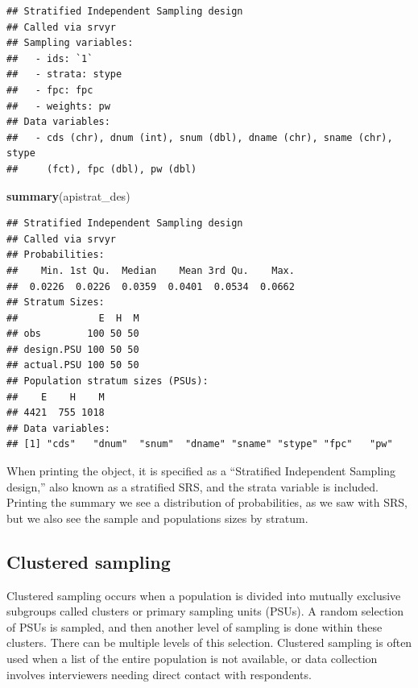 \documentclass[
]{krantz}
\makeatletter
\newenvironment{Shaded}{\begin{snugshade}}{\end{snugshade}}
\newcommand{\FunctionTok}[1]{\textcolor[rgb]{0.27,0.27,0.27}{\textbf{#1}}}
\newcommand{\NormalTok}[1]{#1}
\newenvironment{kframe}{%
\medskip{}
\setlength{\fboxsep}{.8em}
 \def\at@end@of@kframe{}%
 \ifinner\ifhmode%
  \def\at@end@of@kframe{\end{minipage}}%
  \begin{minipage}{\columnwidth}%
 \fi\fi%
 \def\FrameCommand##1{\hskip\@totalleftmargin \hskip-\fboxsep
 \colorbox{shadecolor}{##1}\hskip-\fboxsep
     \hskip-\linewidth \hskip-\@totalleftmargin \hskip\columnwidth}%
 \MakeFramed {\advance\hsize-\width
   \@totalleftmargin\z@ \linewidth\hsize
   \@setminipage}}%
 {\par\unskip\endMakeFramed%
 \at@end@of@kframe}
\renewenvironment{Shaded}{\begin{kframe}}{\end{kframe}}
\makeatother
\begin{document}
\begin{verbatim}
## Stratified Independent Sampling design
## Called via srvyr
## Sampling variables:
##   - ids: `1` 
##   - strata: stype 
##   - fpc: fpc 
##   - weights: pw 
## Data variables: 
##   - cds (chr), dnum (int), snum (dbl), dname (chr), sname (chr), stype
##     (fct), fpc (dbl), pw (dbl)
\end{verbatim}

\begin{Shaded}
\begin{Highlighting}[]
\FunctionTok{summary}\NormalTok{(apistrat\_des)}
\end{Highlighting}
\end{Shaded}

\begin{verbatim}
## Stratified Independent Sampling design
## Called via srvyr
## Probabilities:
##    Min. 1st Qu.  Median    Mean 3rd Qu.    Max. 
##  0.0226  0.0226  0.0359  0.0401  0.0534  0.0662 
## Stratum Sizes: 
##              E  H  M
## obs        100 50 50
## design.PSU 100 50 50
## actual.PSU 100 50 50
## Population stratum sizes (PSUs): 
##    E    H    M 
## 4421  755 1018 
## Data variables:
## [1] "cds"   "dnum"  "snum"  "dname" "sname" "stype" "fpc"   "pw"
\end{verbatim}

When printing the object, it is specified as a ``Stratified Independent Sampling design,'' also known as a stratified SRS, and the strata variable is included. Printing the summary we see a distribution of probabilities, as we saw with SRS, but we also see the sample and populations sizes by stratum.

\hypertarget{samp-cluster}{%
\subsection{Clustered sampling}\label{samp-cluster}}

Clustered sampling occurs when a population is divided into mutually exclusive subgroups called clusters or primary sampling units (PSUs). A random selection of PSUs is sampled, and then another level of sampling is done within these clusters. There can be multiple levels of this selection. Clustered sampling is often used when a list of the entire population is not available, or data collection involves interviewers needing direct contact with respondents.
\end{document}
